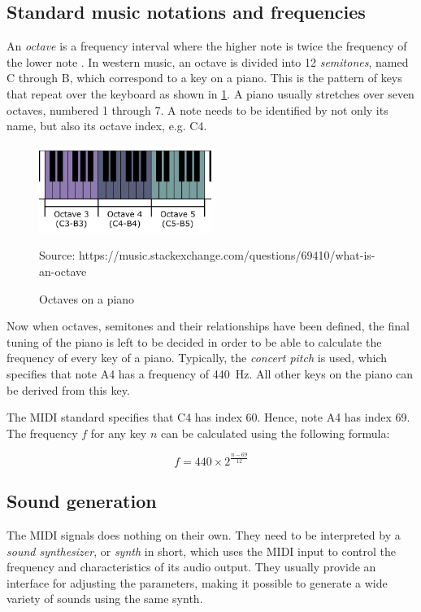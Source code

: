 \documentclass{article}
\newcommand{\source}[1]{\hfill \vspace{-15pt} \caption*{ \footnotesize Source: {#1}} }
\begin{document}
\subsection{Standard music notations and frequencies}
An \textit{octave} is a frequency interval where the higher note is twice the frequency of the lower note \cite{octave}. In western music, an octave is divided into 12 \textit{semitones}, named C through B, which correspond to a key on a piano. This is the pattern of keys that repeat over the keyboard as shown in \ref{fig:octave}. A piano usually stretches over seven octaves, numbered 1 through 7. A note needs to be identified by not only its name, but also its octave index, e.g. C4.

\begin{figure}[h]
  \centering
  \includegraphics[width=0.5\textwidth]{octaves}
  \caption{Octaves on a piano}
  \source{https://music.stackexchange.com/questions/69410/what-is-an-octave}
  \label{fig:octave}
\end{figure}

Now when octaves, semitones and their relationships have been defined, the final tuning of the piano is left to be decided in order to be able to calculate the frequency of every key of a piano. Typically, the \textit{concert pitch} is used, which specifies that note A4 has a frequency of \SI{440}{\hertz}. All other keys on the piano can be derived from this key.

The MIDI standard specifies that C4 has index 60. Hence, note A4 has index 69. The frequency $f$ for any key $n$ can be calculated using the following formula:

$$ f = 440 \times 2^{\frac{n-69}{12}} $$

\subsection{Sound generation}
The MIDI signals does nothing on their own. They need to be interpreted by a \textit{sound synthesizer}, or \textit{synth} in short, which uses the MIDI input to control the frequency and characteristics of its audio output. They usually provide an interface for adjusting the parameters, making it possible to generate a wide variety of sounds using the same synth. 
\end{document}
